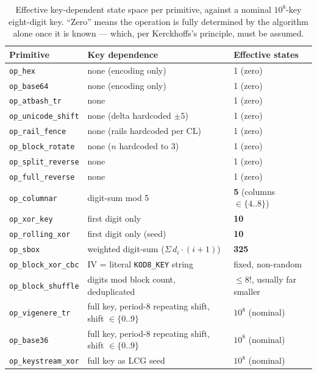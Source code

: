 \documentclass[11pt]{article}
\begin{document}
\begin{table}[h]
\centering
\small
\caption{Effective key-dependent state space per primitive, against a
nominal $10^{8}$-key eight-digit key. ``Zero'' means the operation is
fully determined by the algorithm alone once it is known --- which,
per Kerckhoffs's principle, must be assumed.}
\label{tab:entropy}
\begin{tabular}{@{}lll@{}}
\toprule
\textbf{Primitive} & \textbf{Key dependence} & \textbf{Effective states} \\
\midrule
\texttt{op\_hex}          & none (encoding only)         & 1 (zero) \\
\texttt{op\_base64}       & none (encoding only)         & 1 (zero) \\
\texttt{op\_atbash\_tr}   & none                          & 1 (zero) \\
\texttt{op\_unicode\_shift} & none (delta hardcoded $\pm5$) & 1 (zero) \\
\texttt{op\_rail\_fence}  & none (rails hardcoded per CL) & 1 (zero) \\
\texttt{op\_block\_rotate} & none ($n$ hardcoded to 3)    & 1 (zero) \\
\texttt{op\_split\_reverse} & none                        & 1 (zero) \\
\texttt{op\_full\_reverse} & none                          & 1 (zero) \\
\texttt{op\_columnar}     & digit-sum mod 5 & \textbf{5} (columns $\in\{4..8\}$) \\
\texttt{op\_xor\_key}     & first digit only              & \textbf{10} \\
\texttt{op\_rolling\_xor} & first digit only (seed)       & \textbf{10} \\
\texttt{op\_sbox}         & weighted digit-sum ($\Sigma\, d_i \! \cdot\! (i{+}1)$) & \textbf{325} \\
\texttt{op\_block\_xor\_cbc} & IV = literal \texttt{KOD8\_KEY} string & fixed, non-random \\
\texttt{op\_block\_shuffle} & digits mod block count, deduplicated & $\le 8!$, usually far smaller \\
\texttt{op\_vigenere\_tr} & full key, period-8 repeating shift, shift $\in \{0..9\}$ & $10^{8}$ (nominal) \\
\texttt{op\_base36}       & full key, period-8 repeating shift, shift $\in \{0..9\}$ & $10^{8}$ (nominal) \\
\texttt{op\_keystream\_xor} & full key as LCG seed          & $10^{8}$ (nominal) \\
\bottomrule
\end{tabular}
\end{table}
\end{document}
